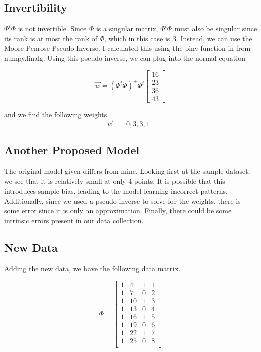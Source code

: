 \documentclass{article}
\begin{document}
\subsection{Invertibility}
$\Phi^t \Phi$ is not invertible. Since $\Phi$ is a singular matrix, $\Phi^t \Phi$ must also be singular since its rank is at most the rank of $\Phi$, which in this case is 3. Instead, we can use the Moore-Penrose Pseudo Inverse. I calculated this using the pinv function in from numpy.linalg. Using this pseudo inverse, we can plug into the normal equation

\[
\Vec{w} = (\Phi^t \Phi)^+  \Phi^t 
\begin{bmatrix}
16\\
23\\
36\\
43
\end{bmatrix}
\]

\noindent
and we find the following weights.
\noindent
\[
\Vec{w} = [0, 3, 3, 1]
\]

\subsection{Another Proposed Model}

The original model given differs from mine. Looking first at the sample dataset, we see that it is relatively small at only 4 points. It is possible that this introduces sample bias, leading to the model learning incorrect patterns. Additionally, since we used a pseudo-inverse to solve for the weights, there is some error since it is only an approximation. Finally, there could be some intrinsic errors present in our data collection. 

\subsection{New Data}
Adding the new data, we have the following data matrix.

\[
\Phi = \begin{bmatrix}
1 & 4 & 1 & 1\\
1 & 7 & 0 & 2\\
1 & 10 & 1 & 3\\
1 & 13 & 0 & 4\\
1 & 16 & 1 & 5\\
1 & 19 & 0 & 6\\
1 & 22 & 1 & 7\\
1 & 25 & 0 & 8\\
\end{bmatrix}
\]
\end{document}
